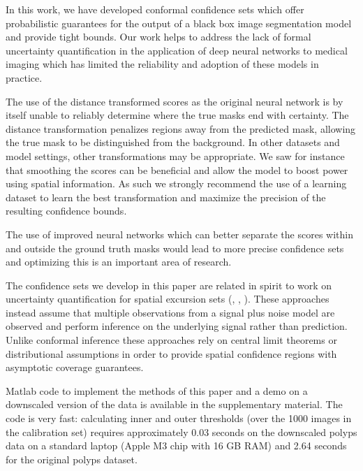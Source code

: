 In this work, we have developed conformal confidence sets which offer probabilistic guarantees for the output of a black box image segmentation model and provide tight bounds. Our work helps to address the lack of formal uncertainty quantification in the application of deep neural networks to medical imaging which has limited the reliability and adoption of these models in practice. 

The use of the distance transformed scores  as the original neural network is by itself unable to reliably determine where the true masks end with certainty. The distance transformation penalizes regions away from the predicted mask, allowing the true mask to be distinguished from the background. In other datasets and model settings, other transformations may be appropriate. We saw for instance that smoothing the scores can be beneficial and allow the model to boost power using spatial information. As such we strongly recommend the use of a learning dataset to learn the best transformation and maximize the precision of the resulting confidence bounds.

The use of improved neural networks which can better separate the scores within and outside the ground truth masks would lead to more precise confidence sets and optimizing this is an important area of research. 

The confidence sets we develop in this paper are related in spirit to work on uncertainty quantification for spatial excursion sets (\cite{chen2017density}, \cite{Bowring2019}, \cite{Mejia2020}). These approaches instead assume that multiple observations from a signal plus noise model are observed and perform inference on the underlying signal rather than prediction. Unlike conformal inference these approaches rely on central limit theorems or distributional assumptions in order to provide spatial confidence regions with asymptotic coverage guarantees. 

Matlab code to implement the methods of this paper and a demo on a downscaled version of the data is available in the supplementary material. The code is very fast: calculating inner and outer thresholds (over the 1000 images in the calibration set) requires approximately 0.03 seconds on the downscaled polyps data on a standard laptop (Apple M3 chip with 16 GB RAM) and 2.64 seconds for the original polyps dataset. 